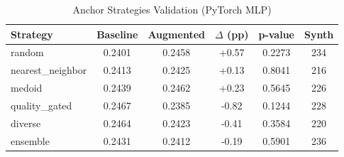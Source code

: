 \begin{table}[htbp]
\centering
\caption{Anchor Strategies Validation (PyTorch MLP)}
\label{tab:pytorch_anchor}
\begin{tabular}{lccccc}
\toprule
Strategy & Baseline & Augmented & $\Delta$ (pp) & p-value & Synth \\
\midrule
random & 0.2401 & 0.2458 & +0.57 & 0.2273 & 234 \\
nearest\_neighbor & 0.2413 & 0.2425 & +0.13 & 0.8041 & 216 \\
medoid & 0.2439 & 0.2462 & +0.23 & 0.5645 & 226 \\
quality\_gated & 0.2467 & 0.2385 & -0.82 & 0.1244 & 228 \\
diverse & 0.2464 & 0.2423 & -0.41 & 0.3584 & 220 \\
ensemble & 0.2431 & 0.2412 & -0.19 & 0.5901 & 236 \\
\bottomrule
\end{tabular}
\end{table}